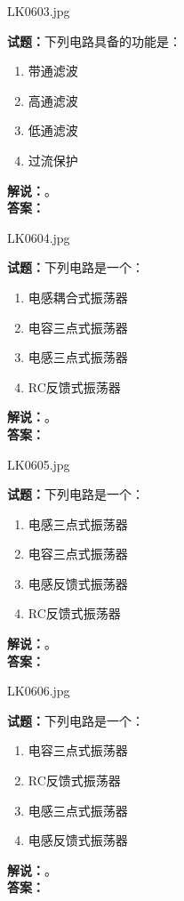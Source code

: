 \documentclass{ctexbook}
\begin{document}
\bigskip

LK0603.jpg

\noindent\textbf{试题：}下列电路具备的功能是：
\begin{enumerate}[leftmargin=3em]
  \item 带通滤波
  \item 高通滤波
  \item 低通滤波
  \item 过流保护
\end{enumerate}
\noindent\textbf{解说：}\textbf{}。\\\noindent\textbf{答案：}

\bigskip

LK0604.jpg

\noindent\textbf{试题：}下列电路是一个：
\begin{enumerate}[leftmargin=3em]
  \item 电感耦合式振荡器
  \item 电容三点式振荡器
  \item 电感三点式振荡器
  \item RC反馈式振荡器
\end{enumerate}
\noindent\textbf{解说：}\textbf{}。\\\noindent\textbf{答案：}

\bigskip

LK0605.jpg

\noindent\textbf{试题：}下列电路是一个：
\begin{enumerate}[leftmargin=3em]
  \item 电感三点式振荡器
  \item 电容三点式振荡器
  \item 电感反馈式振荡器
  \item RC反馈式振荡器
\end{enumerate}
\noindent\textbf{解说：}\textbf{}。\\\noindent\textbf{答案：}

\bigskip

LK0606.jpg

\noindent\textbf{试题：}下列电路是一个：
\begin{enumerate}[leftmargin=3em]
  \item 电容三点式振荡器
  \item RC反馈式振荡器
  \item 电感三点式振荡器
  \item 电感反馈式振荡器
\end{enumerate}
\noindent\textbf{解说：}\textbf{}。\\\noindent\textbf{答案：}
\end{document}

